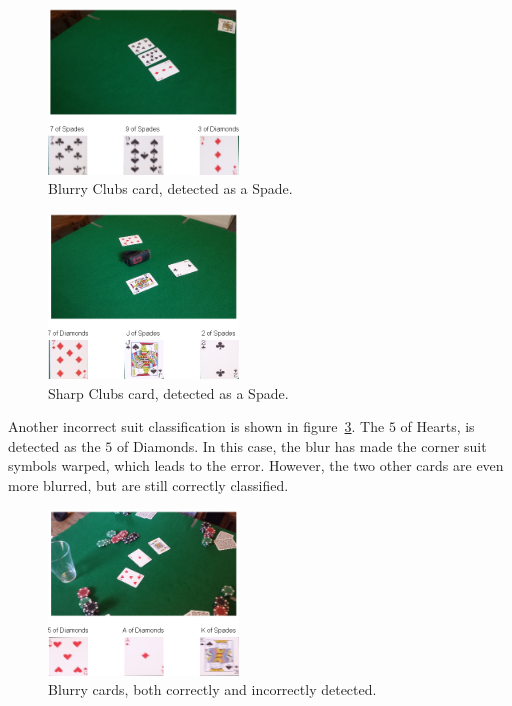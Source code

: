 \documentclass[journal,twoside]{IEEEtran}
\begin{document}
\begin{figure}[placement h]
\centering
\includegraphics[width=0.45\textwidth]{images/testResults/5.png}
\caption{Blurry Clubs card, detected as a Spade.}
\label{fig:error5}
\end{figure}

\begin{figure}[placement h]
\centering
\includegraphics[width=0.45\textwidth]{images/testResults/3.png}
\caption{Sharp Clubs card, detected as a Spade.}
\label{fig:error3}
\end{figure}

Another incorrect suit classification is shown in figure~\ref{fig:error12}. The $5$ of Hearts, is detected as the $5$ of Diamonds. In this case, the blur has made the corner suit symbols warped, which leads to the error. However, the two other cards are even more blurred, but are still correctly classified.

\begin{figure}[placement h]
\centering
\includegraphics[width=0.45\textwidth]{images/testResults/12.png}
\caption{Blurry cards, both correctly and incorrectly detected.}
\label{fig:error12}
\end{figure}
\end{document}
